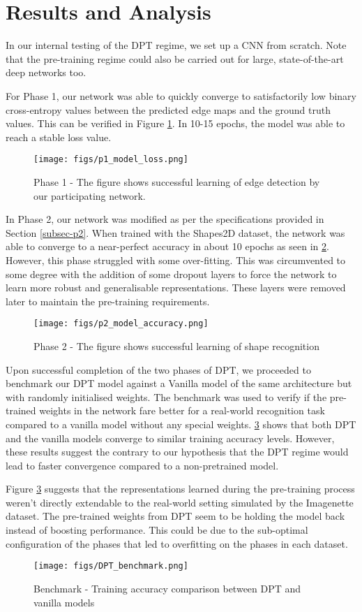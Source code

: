 \section{Results and Analysis}
In our internal testing of the DPT regime, we set up a CNN from scratch. Note that the pre-training regime could also be carried out for large, state-of-the-art deep networks too.

For Phase 1, our network was able to quickly converge to satisfactorily low binary cross-entropy values between the predicted edge maps and the ground truth values. This can be verified in Figure \ref{fig:fig2}. In 10-15 epochs, the model was able to reach a stable loss value.
\begin{figure}
  \centering
  \texttt{[image: figs/p1\_model\_loss.png]}
  \caption{Phase 1 - The figure shows successful learning of edge detection by our participating network.} 
  \label{fig:fig2}
\end{figure}

In Phase 2, our network was modified as per the specifications provided in Section \ref{subsec-p2}. When trained with the Shapes2D dataset, the network was able to converge to a near-perfect accuracy in about 10 epochs as seen in \ref{fig:fig3}. However, this phase struggled with some over-fitting. This was circumvented to some degree with the addition of some dropout layers \cite{srivastava2014dropout} to force the network to learn more robust and generalisable representations. These layers were removed later to maintain the pre-training requirements.

\begin{figure}
  \centering
  \texttt{[image: figs/p2\_model\_accuracy.png]}
  \caption{Phase 2 - The figure shows successful learning of shape recognition} 
  \label{fig:fig3}
\end{figure}

Upon successful completion of the two phases of DPT, we proceeded to benchmark our DPT model against a Vanilla model of the same architecture but with randomly initialised weights. The benchmark was used to verify if the pre-trained weights in the network fare better for a real-world recognition task compared to a vanilla model without any special weights. \ref{fig:fig4} shows that both DPT and the vanilla models converge to similar training accuracy levels. However, these results suggest the contrary to our hypothesis that the DPT regime would lead to faster convergence compared to a non-pretrained model. 

Figure \ref{fig:fig4} suggests that the representations learned during the pre-training process weren't directly extendable to the real-world setting simulated by the Imagenette dataset. The pre-trained weights from DPT seem to be holding the model back instead of boosting performance. This could be due to the sub-optimal configuration of the phases that led to overfitting on the phases in each dataset.

\begin{figure}
  \centering
  \texttt{[image: figs/DPT\_benchmark.png]}
  \caption{Benchmark - Training accuracy comparison between DPT and vanilla models} 
  \label{fig:fig4}
\end{figure}